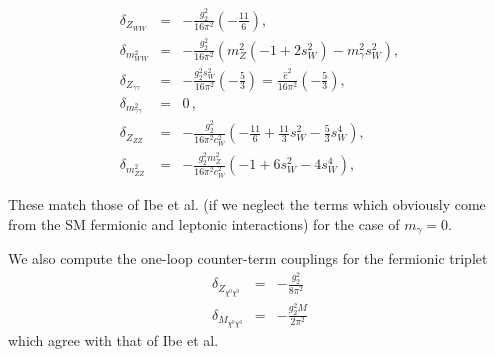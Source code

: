 \documentclass[11pt]{article}
\begin{document}
\begin{eqnarray}
\delta_{Z_{WW}} &=&- \frac{g_2^2}{16 \pi^2}\left(-\frac{11}{6}\right),\\
\delta_{m^2_{WW}}&=&- \frac{g_2^2}{16 \pi^2} \left( m^2_Z(-1+2s_W^2)     -m_{\gamma}^2s_W^2\right),\\
\delta_{Z_{\gamma\gamma}} &=&-\frac{g_2^2s_W^2}{16 \pi^2}\left(-\frac{5}{3}\right) = \frac{\hat{e}^2}{16\pi^2}\left(-\frac{5}{3}\right) , \\
\delta_{m^2_{\gamma\gamma}} &=& 0\, ,\\
\delta_{Z_{ZZ}} &=&-\frac{g_2^2}{16 \pi^2 c_W^2} \left(-\frac{11}{6}+\frac{11}{3}s_W^2-\frac{5}{3}s_W^4  \right),\\
\delta_{m^2_{ZZ}} &=& -\frac{g_2^2m_Z^2}{16 \pi^2c_W^2} \left(-1+6s_W^2-4s_W^4  \right),
\end{eqnarray}

These match those of Ibe et al. (if we neglect the terms which obviously come from the SM fermionic and leptonic interactions) for the case of $m_{\gamma}=0$.

We also compute the one-loop counter-term couplings for the fermionic triplet
\begin{eqnarray}
\delta_{Z_{\chi^0\chi^0}} &=&-\frac{g_2^2}{8 \pi^2}\\
\delta_{M_{\chi^0\chi^0}} &=&-\frac{g_2^2 M}{2 \pi^2}
\end{eqnarray}
which agree with that of Ibe et al.

 
\end{document}

